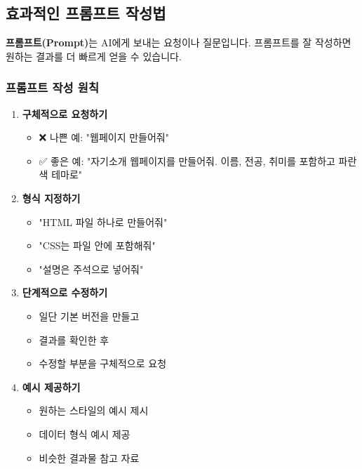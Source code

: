 \documentclass[11pt, a4paper]{article}
\begin{document}
\subsection{효과적인 프롬프트 작성법}

\textbf{프롬프트(Prompt)}는 AI에게 보내는 요청이나 질문입니다. 프롬프트를 잘 작성하면 원하는 결과를 더 빠르게 얻을 수 있습니다.

\subsubsection{프롬프트 작성 원칙}

\begin{enumerate}
  \item \textbf{구체적으로 요청하기}
  \begin{itemize}
    \item ❌ 나쁜 예: "웹페이지 만들어줘"
    \item ✅ 좋은 예: "자기소개 웹페이지를 만들어줘. 이름, 전공, 취미를 포함하고 파란색 테마로"
  \end{itemize}
  
  \item \textbf{형식 지정하기}
  \begin{itemize}
    \item "HTML 파일 하나로 만들어줘"
    \item "CSS는 파일 안에 포함해줘"
    \item "설명은 주석으로 넣어줘"
  \end{itemize}
  
  \item \textbf{단계적으로 수정하기}
  \begin{itemize}
    \item 일단 기본 버전을 만들고
    \item 결과를 확인한 후
    \item 수정할 부분을 구체적으로 요청
  \end{itemize}
  
  \item \textbf{예시 제공하기}
  \begin{itemize}
    \item 원하는 스타일의 예시 제시
    \item 데이터 형식 예시 제공
    \item 비슷한 결과물 참고 자료
  \end{itemize}
\end{enumerate}

\newpage
\end{document}
